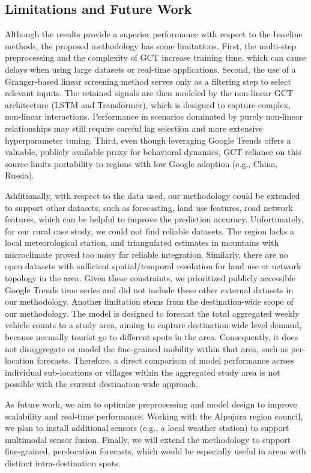 \documentclass[acmsmall]{acmart}
\begin{document}
{\color{black}
\subsection{Limitations and Future Work} \label{sec:limitations}

Although the results provide a superior performance with respect to the baseline methods, the proposed methodology has some limitations. First, the multi-step preprocessing and the complexity of GCT increase training time, which can cause delays when using large datasets or real-time applications. Second, the use of a Granger-based linear screening method serves only as a filtering step to select relevant inputs. The retained signals are then modeled by the non-linear GCT architecture (LSTM and Transformer), which is designed to capture complex, non-linear interactions. Performance in scenarios dominated by purely non-linear relationships may still require careful lag selection and more extensive hyperparameter tuning. Third, even though leveraging Google Trends offers a valuable, publicly available proxy for behavioral dynamics, GCT reliance on this source limits portability to regions with low Google adoption (e.g., China, Russia).

Additionally, with respect to the data used, our methodology could be extended to support other datasets, such as forecasting, land use features, road network features, which can be helpful to improve the prediction accuracy. Unfortunately, for our rural case study, we could not find reliable datasets. The region lacks a local meteorological station, and triangulated estimates in mountains with microclimate proved too noisy for reliable integration. Similarly, there are no open datasets with sufficient spatial/temporal resolution for land use or network topology in the area. Given these constraints, we prioritized publicly accessible Google Trends time series and did not include these other external datasets in our methodology. Another limitation stems from the destination-wide scope of our methodology. The model is designed to forecast the total aggregated weekly vehicle counts to a study area, aiming to capture destination-wide level demand, because normally tourist go to different spots in the area. Consequently, it does not disaggregate or model the fine-grained mobility within that area, such as per-location forecasts. {\color{blue}Therefore, a direct comparison of model performance across individual sub-locations or villages within the aggregated study area is not possible with the current destination-wide approach.}


As future work, we aim to optimize preprocessing and model design to improve scalability and real-time performance. Working with the Alpujara region council, we plan to install additional sensors (e.g., a local weather station) to support multimodal sensor fusion. Finally, we will extend the methodology to support fine-grained, per-location forecasts, which would be especially useful in areas with distinct intra-destination spots.
}
\end{document}
